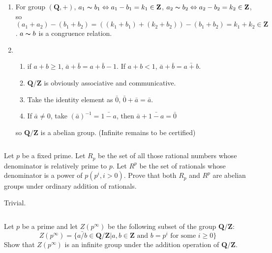 \begin{answer}
    \begin{enumerate}
        \item For group $(\mathbf{Q}, +)$, $a_1\thicksim b_1\Leftrightarrow a_1-b_1=k_1\in \mathbf{Z}$, $a_2\thicksim b_2\Leftrightarrow a_2-b_2=k_2\in \mathbf{Z}$, so $(a_1+a_2)-(b_1+b_2)=((k_1+b_1)+(k_2+b_2))-(b_1+b_2)=k_1+k_2\in\mathbf{Z}$. $a\thicksim b$ is a congruence relation.
        \item \begin{enumerate}[1]
            \item if $a+b\geq 1$, $\bar{a}+\bar{b}=\bar{a+b-1}$. If $a+b<1$, $\bar{a}+\bar{b}=\bar{a+b}$.
            \item $\mathbf{Q}/\mathbf{Z}$ is obviously associative and communicative.
            \item Take the identity element as $\bar{0}$, $\bar{0}+\bar{a}=\bar{a}$.
            \item If $\bar{a}\neq 0$, take $(\bar{a})^{-1}=\bar{1-a}$, then $\bar{a}+\bar{1-a}=\bar{0}$
        \end{enumerate}
        so $\mathbf{Q}/\mathbf{Z}$ is a abelian group. (Infinite remains to be certified)
    \end{enumerate}
\end{answer}

$$ $$

\begin{ex}
    Let $p$ be a fixed prime. Let $R_p$ be the set of all those rational numbers whose denominator is relatively prime to $p$. Let $R^p$ be the set of rationals whose denominator is a power of $p (p^i, i > 0)$. Prove that both $R_p$ and $R^p$ are abelian groups under ordinary addition of rationals.
\end{ex}

\begin{answer}
    Trivial.
\end{answer}

$$ $$

\begin{ex}
    Let $p$ be a prime and let $Z(p^\infty)$ be the following subset of the group $\mathbf{Q}/\mathbf{Z}$:\[Z(p^\infty)=\{\bar{a/b}\in\mathbf{Q}/\mathbf{Z}| a,b \in \mathbf{Z} \text{ and } b=p^i \text{ for some }i\geq 0\}\]
    Show that $Z(p^\infty)$ is an infinite group under the addition operation of $\mathbf{Q}/\mathbf{Z}$.
\end{ex}

